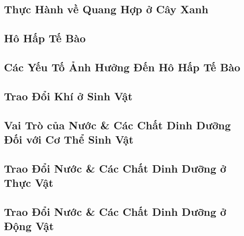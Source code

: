 \documentclass{article}
\numberwithin{equation}{section}
\begin{document}

\subsection{Thực Hành về Quang Hợp ở Cây Xanh}


\subsection{Hô Hấp Tế Bào}


\subsection{Các Yếu Tố Ảnh Hưởng Đến Hô Hấp Tế Bào}


\subsection{Trao Đổi Khí ở Sinh Vật}


\subsection{Vai Trò của Nước \& Các Chất Dinh Dưỡng Đối với Cơ Thể Sinh Vật}


\subsection{Trao Đổi Nước \& Các Chất Dinh Dưỡng ở Thực Vật}


\subsection{Trao Đổi Nước \& Các Chất Dinh Dưỡng ở Động Vật}
\end{document}
